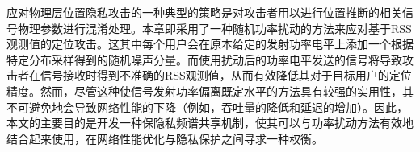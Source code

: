 
应对物理层位置隐私攻击的一种典型的策略是对攻击者用以进行位置推断的相关信号物理参数进行混淆处理\cite{Jiang07, EI10, Sangho12}。本章即采用了一种随机功率扰动的方法来应对基于RSS观测值的定位攻击。这其中每个用户会在原本给定的发射功率电平上添加一个根据特定分布采样得到的随机噪声分量。而使用扰动后的功率电平发送的信号将导致攻击者在信号接收时得到不准确的RSS观测值，从而有效降低其对于目标用户的定位精度。然而，尽管这种使信号发射功率偏离既定水平的方法具有较强的实用性，其不可避免地会导致网络性能的下降（例如，吞吐量的降低和延迟的增加）。因此，本文的主要目的是开发一种保隐私频谱共享机制，使其可以与功率扰动方法有效地结合起来使用，在网络性能优化与隐私保护之间寻求一种权衡。


